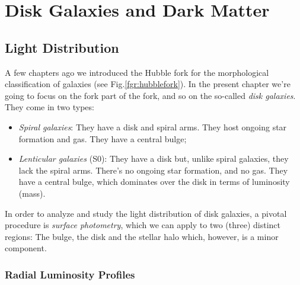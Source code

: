 \chapter{Disk Galaxies and Dark Matter}\label{ch:vi}

\section{Light Distribution}

A few chapters ago we introduced the Hubble fork for the morphological classification of galaxies (see Fig.\ref{fgr:hubblefork}). In the present chapter we're going to focus on the fork part of the fork, and so on the so-called \emph{disk galaxies}. They come in two types:
\begin{itemize}
    \item \emph{Spiral galaxies}: They have a disk and spiral arms. They host ongoing star formation and gas. They have a central bulge;
    \item \emph{Lenticular galaxies} (S0): They have a disk but, unlike spiral galaxies, they lack the spiral arms. There's no ongoing star formation, and no gas. They have a central bulge, which dominates over the disk in terms of luminosity (mass).
\end{itemize}
In order to analyze and study the light distribution of disk galaxies, a pivotal procedure is \emph{surface photometry}, which we can apply to two (three) distinct regions: The bulge, the disk and the stellar halo which, however, is a minor component.

\subsection*{Radial Luminosity Profiles}

